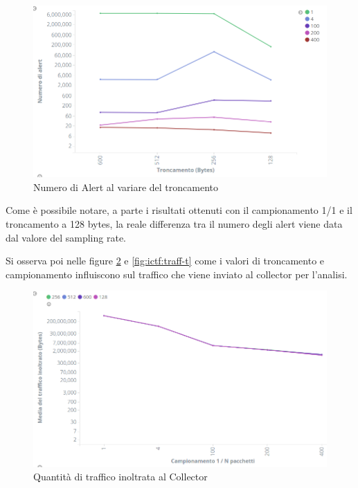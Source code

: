 \documentclass[12pt,a4paper,openright,twoside]{report}
\begin{document}
\begin{figure}[h!]
\begin{center}                          %
  \includegraphics[width=\textwidth]{images/ICTF--tunc-vs-samp.png}
  \caption{Numero di Alert al variare del troncamento}
  \label{}
\end{center}
\end{figure}

Come \`e possibile notare, a parte i risultati ottenuti con il campionamento 1/1 e il
troncamento a 128 bytes, la reale differenza tra il numero degli alert viene data dal
valore del sampling rate.

Si osserva poi nelle figure \ref{fig:ictf:traff-s} e \ref{fig:ictf:traff-t} come i valori di troncamento e campionamento influiscono sul traffico
che viene inviato al collector per l'analisi.

\begin{figure}[h!]
\begin{center}                          %
  \includegraphics[width=\textwidth]{images/ICTF-samp-vs-traffic.png}
  \caption{Quantit\`a di traffico inoltrata al Collector}
  \label{fig:ictf:traff-s}
\end{center}
\end{figure}
\end{document}
